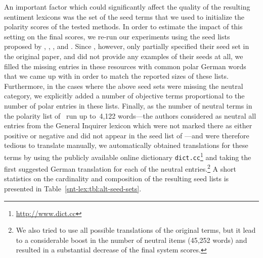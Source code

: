 An important factor which could significantly affect the quality of
the resulting sentiment lexicons was the set of the seed terms that we
used to initialize the polarity scores of the tested methods.  In
order to estimate the impact of this setting on the final scores, we
re-run our experiments using the seed lists proposed by \citet{Hu:04},
\citet{Kim:04}, \citet{Esuli:06c}, and \citet{Remus:10}.  Since
\citet{Hu:04}, however, only partially specified their seed set in the
original paper, and \citet{Kim:04} did not provide any examples of
their seeds at all, we filled the missing entries in these resources
with common polar German words that we came up with in order to match
the reported sizes of these lists.  Furthermore, in the cases where
the above seed sets were missing the neutral category, we explicitly
added a number of objective terms proportional to the number of polar
entries in these lists.  Finally, as the number of neutral terms in
the polarity list of~\citet{Esuli:06c} run up to~4,122 words---the
authors considered as neutral all entries from the General Inquirer
lexicon \cite{Stone:66} which were not marked there as either positive
or negative and did not appear in the seed list of
\citet{Turney:03}---and were therefore tedious to translate manually,
we automatically obtained translations for these terms by using the
publicly available online dictionary
\texttt{dict.cc}\footnote{\url{http://www.dict.cc}} and taking the
first suggested German translation for each of the neutral
entries.\footnote{We also tried to use all possible translations of
  the original terms, but it lead to a considerable boost in the
  number of neutral items (45,252 words) and resulted in a substantial
  decrease of the final system scores.} A short statistics on the
cardinality and composition of the resulting seed lists is presented
in Table~\ref{snt-lex:tbl:alt-seed-sets}.

